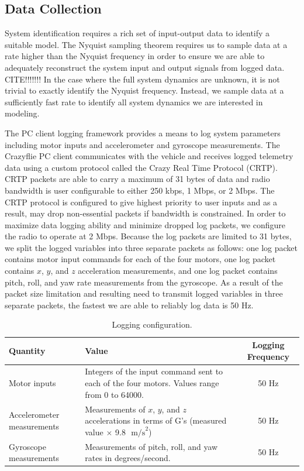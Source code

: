 \subsection{Data Collection}
System identification requires a rich set of input-output data to identify a suitable model. The Nyquist sampling theorem requires us to sample data at a rate higher than the Nyquist frequency in order to ensure we are able to adequately reconstruct the system input and output signals from logged data. CITE!!!!!!! In the case where the full system dynamics are unknown, it is not trivial to exactly identify the Nyquist frequency. Instead, we sample data at a sufficiently fast rate to identify all system dynamics we are interested in modeling. 

The PC client logging framework provides a means to log system parameters including motor inputs and accelerometer and gyroscope measurements. The Crazyflie PC client communicates with the vehicle and receives logged telemetry data using a custom protocol called the Crazy Real Time Protocol (CRTP). CRTP packets are able to carry a maximum of 31 bytes of data and radio bandwidth is user configurable to either 250 kbps, 1 Mbps, or 2 Mbps. The CRTP protocol is configured to give highest priority to user inputs and as a result, may drop non-essential packets if bandwidth is constrained. In order to maximize data logging ability and minimize dropped log packets, we configure the radio to operate at 2 Mbps. Because the log packets are limited to 31 bytes, we split the logged variables into three separate packets as follows: one log packet contains motor input commands for each of the four motors, one log packet contains $x$, $y$, and $z$ acceleration measurements, and one log packet contains pitch, roll, and yaw rate measurements from the gyroscope. As a result of the packet size limitation and resulting need to transmit logged variables in three separate packets, the fastest we are able to reliably log data is 50 Hz.
\begin{table}[!htb]
\centering
\caption{Logging configuration.}\vspace{1em}
\begin{tabular}{p{7em}p{17em}c}
\toprule
Quantity & Value & Logging Frequency\\
\midrule
Motor inputs & Integers of the input command sent to each of the four motors. Values range from 0 to 64000. & 50 Hz \\[5em]
Accelerometer measurements & Measurements of $x$, $y$, and $z$ accelerations in terms of G's (measured value $\times$ 9.8 $\mbox{ m/s}^2$) & 50 Hz\\[3em]
Gyroscope \hspace{2em}measurements & Measurements of pitch, roll, and yaw rates in degrees/second. & 50 Hz\\
\bottomrule
\end{tabular}
\end{table}


